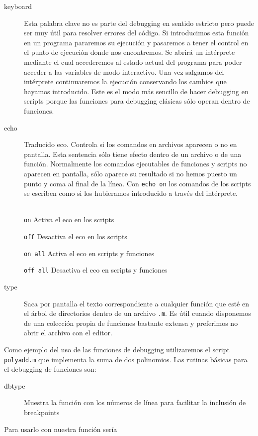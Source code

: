 \begin{description}
\item [keyboard]Esta palabra clave no es parte del debugging en
  sentido estricto pero puede ser muy útil para resolver errores del
  código.  Si introducimos esta función en un programa pararemos su
  ejecución y pasaremos a tener el control en el punto de ejecución
  donde nos encontremos. Se abrirá un intérprete mediante el cual
  accederemos al estado actual del programa para poder acceder a las
  variables de modo interactivo. Una vez salgamos del intérprete
  continuaremos la ejecución conservando los cambios que hayamos
  introducido. Este es el modo más sencillo de hacer debugging en
  scripts porque las funciones para debugging clásicas sólo operan
  dentro de funciones.
\item [{echo}] Traducido eco.  Controla si los comandos en
  archivos aparecen o no en pantalla. Esta sentencia sólo tiene efecto
  dentro de un archivo o de una función.  Normalmente los comandos
  ejecutables de funciones y scripts no aparecen en pantalla, sólo
  aparece su resultado si no hemos puesto un punto y coma al final de
  la línea. Con \texttt{echo on} los comandos de los scripts se
  escriben como si los hubieramos introducido a través
  del intérprete.\\
  \\
  \begin{minipage}[c]{1\linewidth}%
    \texttt{on} Activa el eco en los scripts

    \texttt{off} Desactiva el eco en los scripts

    {\texttt{on all}} Activa el eco en scripts y funciones

    {\texttt{off all}} Desactiva el eco en scripts y
    funciones\end{minipage}%

\item [type]Saca por pantalla el texto correspondiente a
  cualquier función que esté en el árbol de directorios dentro de un
  archivo \texttt{.m}.  Es útil cuando disponemos de una colección
  propia de funciones bastante extensa y preferimos no abrir el
  archivo con el editor.
\end{description}
Como ejemplo del uso de las funciones de debugging utilizaremos el
script \texttt{polyadd.m} que implementa la suma de dos polinomios.
Las rutinas básicas para el debugging de funciones son:

\begin{description}
\item [dbtype]Muestra la función con los números de
  línea para facilitar la inclusión de breakpoints
\end{description}
Para usarlo con nuestra función sería

